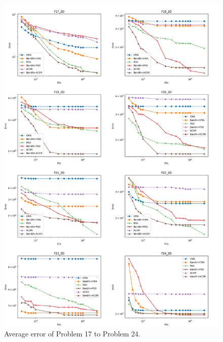 \begin{figure}
\centering
\includegraphics[width=\textwidth]{Average_F17_F24}
\caption{Average error of Problem 17 to Problem 24.}\label{fig:Average_F17_F24}
\end{figure}

